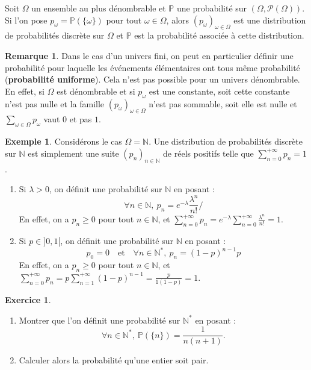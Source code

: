 \documentclass[french]{article}
\renewcommand{\P}{\mathbb{P}}
\newcommand{\N}{\mathbb{N}}
\newcommand{\st}{^*}
\theoremstyle{plain}
\theoremstyle{definition}
\newtheorem*{ex}{Exemple}
\newtheorem{exo}{Exercice}
\newtheorem*{rmq}{Remarque}
\theoremstyle{remark}
\begin{document}
\begin{thm}{}%
	Soit $\Omega$ un ensemble au plus dénombrable et $\P$ une probabilité sur $(\Omega,\mathcal{P}(\Omega))$. Si l'on pose $p_\omega=\P(\{\omega\})$ pour tout $\omega\in\Omega$, alors $(p_\omega)_{\omega\in\Omega}$ est une distribution de probabilités discrète sur $\Omega$ et $\P$ est la probabilité associée à cette distribution.
\end{thm}

\begin{rmq}
	Dans le cas d'un univers fini, on peut en particulier définir une probabilité pour laquelle les événements élémentaires ont tous même probabilité (\textbf{probabilité uniforme}). Cela n'est pas possible pour un univers dénombrable. En effet, si $\Omega$ est dénombrable et si $p_\omega$ est une constante, soit cette constante n'est pas nulle et la famille $(p_\omega)_{\omega\in\Omega}$ n'est pas sommable, soit elle est nulle et $\displaystyle\sum_{\omega\in\Omega}p_\omega$ vaut $0$ et pas $1$.
\end{rmq}

\begin{ex}
	Considérons le cas $\Omega=\N$. Une distribution de probabilités discrète sur $\N$ est simplement une suite $(p_n)_{n\in\N}$ de réels positifs telle que $\displaystyle\sum_{n=0}^{+\infty}p_n=1$.
	\begin{enumerate}
		\item Si $\lambda>0$, on définit une probabilité sur $\N$ en posant : 
		$$\forall n\in\N,\ p_n=e^{-\lambda}\frac{\lambda^n}{n!}/$$
		En effet, on a $p_n\geqslant 0$ pour tout $n\in\N$, et $\displaystyle\sum_{n=0}^{+\infty}p_n=e^{-\lambda}\sum_{n=0}^{+\infty}\frac{\lambda^n}{n!}=1$.
		\item Si $p\in]0,1[$, on définit une probabilité sur $\N$ en posant : 
		$$p_0=0\quad\text{et}\quad\forall n\in\N\st,\ p_n=(1-p)^{n-1}p$$
		En effet, on a $p_n\geqslant 0$ pour tout $n\in\N$, et $\displaystyle\sum_{n=0}^{+\infty}p_n=p\sum_{n=1}^{+\infty}(1-p)^{n-1}=\frac{p}{1(1-p)}=1$.
	\end{enumerate}
\end{ex}

\begin{exo}
	\begin{enumerate}
		\item Montrer que l'on définit une probabilité sur $\N\st$ en posant : $$\forall n\in\N\st,\ \P(\{n\})=\frac{1}{n(n+1)}.$$
		\item Calculer alors la probabilité qu'une entier soit pair.
	\end{enumerate}
\end{exo}
\end{document}
